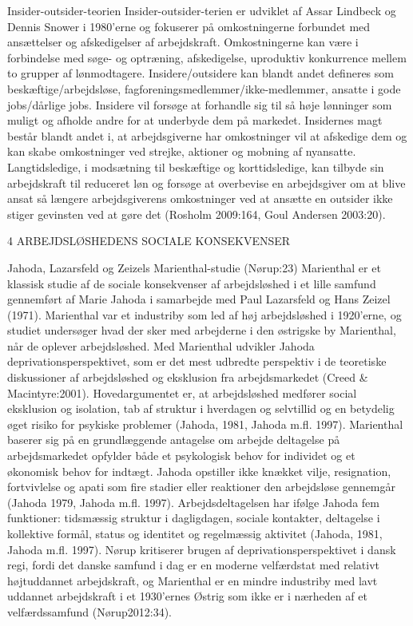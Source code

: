 Insider-outsider-teorien
Insider-outsider-terien er udviklet af Assar Lindbeck og Dennis Snower i 1980'erne og fokuserer på omkostningerne forbundet med ansættelser og afskedigelser af arbejdskraft. Omkostningerne kan være i forbindelse med søge- og optræning, afskedigelse, uproduktiv konkurrence mellem to grupper af lønmodtagere. Insidere/outsidere kan blandt andet defineres som beskæftige/arbejdsløse, fagforeningsmedlemmer/ikke-medlemmer, ansatte i gode jobs/dårlige jobs. Insidere vil forsøge at forhandle sig til så høje lønninger som muligt og afholde andre for at underbyde dem på markedet. Insidernes magt består blandt andet i, at arbejdsgiverne har omkostninger vil at afskedige dem og kan skabe omkostninger ved strejke, aktioner og mobning af nyansatte. Langtidsledige, i modsætning til beskæftige og korttidsledige, kan tilbyde sin arbejdskraft til reduceret løn og forsøge at overbevise en arbejdsgiver om at blive ansat så længere arbejdsgiverens omkostninger ved at ansætte en outsider ikke stiger gevinsten ved at gøre det (Rosholm 2009:164, Goul Andersen 2003:20).



4 ARBEJDSLØSHEDENS SOCIALE KONSEKVENSER

Jahoda, Lazarsfeld og Zeizels Marienthal-studie (Nørup:23)
Marienthal er et klassisk studie af de sociale konsekvenser af arbejdsløshed i et lille samfund gennemført af Marie Jahoda i samarbejde med Paul Lazarsfeld og Hans Zeizel (1971). Marienthal var et industriby som led af høj arbejdsløshed i 1920'erne, og studiet undersøger hvad der sker med arbejderne i den østrigske by Marienthal, når de oplever arbejdsløshed. Med Marienthal udvikler Jahoda deprivationsperspektivet, som er det mest udbredte perspektiv i de teoretiske diskussioner af arbejdsløshed og eksklusion fra arbejdsmarkedet (Creed & Macintyre:2001). Hovedargumentet er, at arbejdsløshed medfører social eksklusion og isolation, tab af struktur i hverdagen og selvtillid og en betydelig øget risiko for psykiske problemer (Jahoda, 1981, Jahoda m.fl. 1997). Marienthal baserer sig på en grundlæggende antagelse om arbejde deltagelse på arbejdsmarkedet opfylder både et psykologisk behov for individet og et økonomisk behov for indtægt. Jahoda opstiller ikke knækket vilje, resignation, fortvivlelse og apati som fire stadier eller reaktioner den arbejdsløse gennemgår (Jahoda 1979, Jahoda m.fl. 1997). Arbejdsdeltagelsen har ifølge Jahoda fem funktioner: tidsmæssig struktur i dagligdagen, sociale kontakter, deltagelse i kollektive formål, status og identitet og regelmæssig aktivitet (Jahoda, 1981, Jahoda m.fl. 1997).
Nørup kritiserer brugen af deprivationsperspektivet i dansk regi, fordi det danske samfund i dag er en moderne velfærdstat med relativt højtuddannet arbejdskraft, og Marienthal er en mindre industriby med lavt uddannet arbejdskraft i et 1930'ernes Østrig som ikke er i nærheden af et velfærdssamfund (Nørup2012:34).

